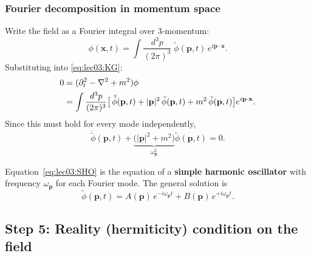 \subsubsection*{Fourier decomposition in momentum space}

Write the field as a Fourier integral over 3-momentum:
\begin{equation}
  \phi(\mathbf{x},t)
  = \int \frac{d^3p}{(2\pi)^3}\;
       \tilde\phi(\mathbf{p},t)\,e^{i\mathbf{p}\cdot\mathbf{x}}.
  \label{eq:lec03:Fourier-def}
\end{equation}
Substituting into \eqref{eq:lec03:KG}:
\begin{align}
  0
  &= (\partial_t^2 - \nabla^2 + m^2)\phi \notag\\
  &= \int \frac{d^3p}{(2\pi)^3}
       \bigl[\,\ddot{\tilde\phi}(\mathbf{p},t)
             + |\mathbf{p}|^2\,\tilde\phi(\mathbf{p},t)
             + m^2\,\tilde\phi(\mathbf{p},t)\bigr]
       e^{i\mathbf{p}\cdot\mathbf{x}}.
  \label{eq:lec03:KG-decomp}
\end{align}
Since this must hold for every mode independently,
\begin{equation}
  \ddot{\tilde\phi}(\mathbf{p},t)
  + \underbrace{\bigl(|\mathbf{p}|^2 + m^2\bigr)}_{\omega_{\mathbf{p}}^2}
    \tilde\phi(\mathbf{p},t) = 0.
  \label{eq:lec03:SHO}
\end{equation}


Equation~\eqref{eq:lec03:SHO} is the equation of a
\textbf{simple harmonic oscillator} with frequency $\omega_{\mathbf{p}}$
for each Fourier mode.  The general solution is
\begin{equation}
  \tilde\phi(\mathbf{p},t)
  = A(\mathbf{p})\,e^{-i\omega_{\mathbf{p}}t}
    + B(\mathbf{p})\,e^{+i\omega_{\mathbf{p}}t}.
  \label{eq:lec03:SHO-sol}
\end{equation}

\subsection*{Step 5: Reality (hermiticity) condition on the field}

